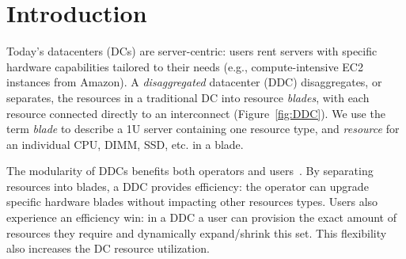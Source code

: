 
\section{Introduction} 
\label{sec:intro}
Today's datacenters (DCs) are server-centric: users rent servers with
specific hardware capabilities tailored to their needs (e.g.,
compute-intensive EC2 instances from Amazon). 
A \emph{disaggregated} datacenter (DDC) disaggregates, or separates,
the resources in a traditional DC into resource \emph{blades},
with each resource connected directly to an interconnect (Figure~\ref{fig:DDC}). 
We use the term \emph{blade} to describe a 1U server containing one resource
type, and \emph{resource} for an individual CPU, DIMM, SSD, etc. in a blade. 


The modularity of DDCs benefits both operators and
users~\cite{Han2013}. By separating resources into blades, a
DDC provides efficiency: the operator can upgrade specific hardware
blades without impacting other resources types. Users also experience
an efficiency win: in a DDC a user can provision the exact amount of
resources they require and dynamically expand/shrink this set. This flexibility
also increases the DC resource utilization.




